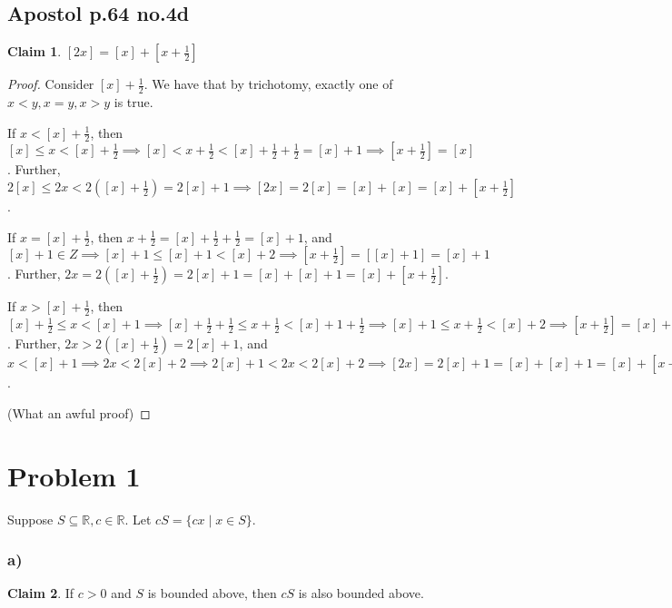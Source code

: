 \documentclass[12pt,letterpaper]{article}
\theoremstyle{definition}
\newtheorem*{claim}{Claim}
\newcommand{\R}{\mathbb{R}}
\begin{document}
\subsection*{Apostol p.64 no.4d}

\begin{claim}
  $[2x] = [x] + [x + \frac{1}{2}]$
\end{claim}

\begin{proof}
  Consider $[x] + \frac{1}{2}$. We have that by trichotomy, exactly one of
  $x < y, x = y, x > y$ is true.

  If $x < [x]+\frac{1}{2}$, then $[x] \leq x < [x] + \frac{1}{2} \implies [x]
  < x + \frac{1}{2} < [x] + \frac{1}{2} + \frac{1}{2} = [x] + 1 \implies [x +
  \frac{1}{2}] = [x]$. Further, $2[x] \leq 2x < 2([x] + \frac{1}{2}) = 2[x] + 1 \implies [2x]
  = 2[x] = [x] + [x] = [x] + [x + \frac{1}{2}]$.

  If $x = [x]+\frac{1}{2}$, then $x + \frac{1}{2} = [x] + \frac{1}{2} + \frac{1}{2} = [x] +
  1$, and $[x] + 1 \in Z \implies [x] + 1 \leq [x] + 1 < [x] + 2 \implies [x +
  \frac{1}{2}] = [[x] + 1] = [x] + 1$. Further, $2x = 2([x] + \frac{1}{2}) = 2[x]
  + 1 = [x] + [x] + 1 = [x] + [x + \frac{1}{2}]$.

  If $x > [x]+\frac{1}{2}$, then $[x] + \frac{1}{2} \leq x < [x] + 1 \implies [x] +
  \frac{1}{2} + \frac{1}{2} \leq x + \frac{1}{2} < [x] + 1 + \frac{1}{2}
  \implies [x] + 1 \leq x + \frac{1}{2} < [x] + 2 \implies [x + \frac{1}{2}] =
  [x] + 1$. Further, $2x > 2([x] + \frac{1}{2}) = 2[x] + 1$, and $x < [x] + 1
  \implies 2x < 2[x] + 2 \implies 2[x] + 1 < 2x < 2[x] + 2 \implies [2x] = 2[x]
  + 1 = [x] + [x] + 1 = [x] + [x + \frac{1}{2}]$.

  (What an awful proof)
\end{proof}

\section*{Problem 1}

Suppose $S \subseteq \R, c \in \R$. Let $cS = \{cx \mid x \in S\}$.

\subsubsection*{a)}

\begin{claim}
  If $c > 0$ and $S$ is bounded above, then $cS$ is also bounded above.
\end{claim}
\end{document}
